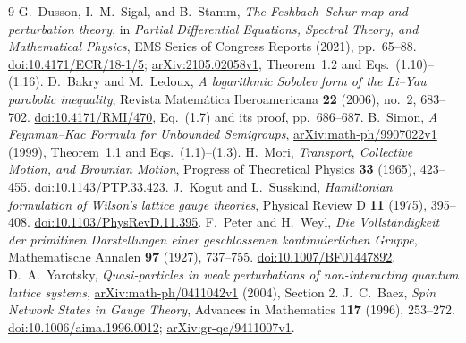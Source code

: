 \documentclass[11pt]{article}
\begin{document}
\clearpage
\begin{thebibliography}{9}
G.~Dusson, I.~M.~Sigal, and B.~Stamm,
\emph{The Feshbach--Schur map and perturbation theory},
in \emph{Partial Differential Equations, Spectral Theory, and Mathematical
Physics}, EMS Series of Congress Reports (2021), pp.~65--88.
\href{https://doi.org/10.4171/ECR/18-1/5}{doi:10.4171/ECR/18-1/5};
\href{https://arxiv.org/abs/2105.02058v1}{arXiv:2105.02058v1},
Theorem~1.2 and Eqs.~(1.10)--(1.16).
D.~Bakry and M.~Ledoux,
\emph{A logarithmic Sobolev form of the Li--Yau parabolic inequality},
Revista Matem\'atica Iberoamericana \textbf{22} (2006), no.~2, 683--702.
\href{https://doi.org/10.4171/RMI/470}{doi:10.4171/RMI/470},
Eq.~(1.7) and its proof, pp.~686--687.
B.~Simon, \emph{A Feynman--Kac Formula for Unbounded Semigroups},
\href{https://arxiv.org/abs/math-ph/9907022v1}{arXiv:math-ph/9907022v1}
(1999), Theorem~1.1 and Eqs.~(1.1)--(1.3).
H.~Mori, \emph{Transport, Collective Motion, and Brownian Motion},
Progress of Theoretical Physics \textbf{33} (1965), 423--455.
\href{https://doi.org/10.1143/PTP.33.423}{doi:10.1143/PTP.33.423}.
J.~Kogut and L.~Susskind,
\emph{Hamiltonian formulation of Wilson's lattice gauge theories},
Physical Review D \textbf{11} (1975), 395--408.
\href{https://doi.org/10.1103/PhysRevD.11.395}{doi:10.1103/PhysRevD.11.395}.
F.~Peter and H.~Weyl,
\emph{Die Vollst\"andigkeit der primitiven Darstellungen einer
geschlossenen kontinuierlichen Gruppe},
Mathematische Annalen \textbf{97} (1927), 737--755.
\href{https://doi.org/10.1007/BF01447892}{doi:10.1007/BF01447892}.
D.~A.~Yarotsky, \emph{Quasi-particles in weak perturbations of
non-interacting quantum lattice systems},
\href{https://arxiv.org/abs/math-ph/0411042v1}{arXiv:math-ph/0411042v1}
(2004), Section 2.
J.~C.~Baez, \emph{Spin Network States in Gauge Theory},
Advances in Mathematics \textbf{117} (1996), 253--272.
\href{https://doi.org/10.1006/aima.1996.0012}{doi:10.1006/aima.1996.0012};
\href{https://arxiv.org/abs/gr-qc/9411007v1}{arXiv:gr-qc/9411007v1}.
\end{thebibliography}
\end{document}
